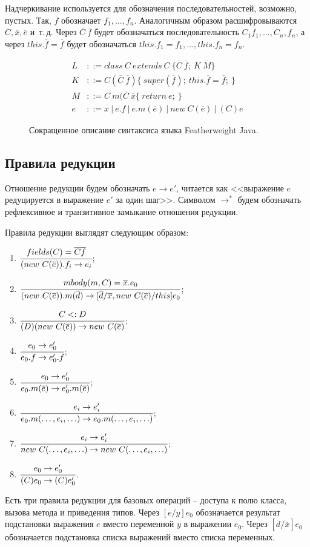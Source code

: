 Надчеркивание используется для обозначения последовательностей, возможно, пустых.
Так, $\overline{f}$ обозначает $f_1, \ldots, f_n$.
Аналогичным образом расшифровываются $\overline{C}, \overline{x}, \overline{e}$ и~т.\,д.
Через $\overline{C}\ \overline{f}$ будет обозначаться последовательность $C_1 f_1, \ldots, C_n, f_n$,
а через $this.\overline{f} = \overline{f}$ будет обозначаться $this.f_1 = f_1, \ldots, this.f_n = f_n$.
\begin{figure}
    \begin{align*}
        L &::= class\ C\ extends\ C\ \{\overline{C}\ \overline{f};\ K\ \overline{M}\}\\
        K &::= C(\overline{C}\ \overline{f})\{\ super(\overline{f});\ this.\overline{f} = \overline{f};\ \}\\
        M &::= C\ m(\overline{C}\ \overline{x}\{\ return\ e;\ \}\\
        e &::= x\ |\ e.f\ |\ e.m(\overline{e})\ |\ new\ C(\overline{e})\ |\ (C)e
    \end{align*}
    \caption{Сокращенное описание синтаксиса языка Featherweight Java.}
    \label{fj-syntax}
\end{figure}
\subsection{Правила редукции}
Отношение редукции будем обозначать $e \rightarrow e'$, читается как <<выражение $e$ редуцируется в выражение $e'$ за один шаг>>.
Символом $\rightarrow^*$ будем обозначать рефлексивное и транзитивное замыкание отношения редукции.

Правила редукции выглядят следующим образом:
\begin{enumerate}
    \item $\cfrac{fields(C) = \overline{C}\overline{f}}{(new\ C(\overline{e})).f_i \rightarrow e_i}$;
    \item $\cfrac{mbody(m, C) = \overline{x}.e_0}{(new\ C(\overline{e})).m(\overline{d}) \rightarrow [\overline{d}/\overline{x}, new\ C(\overline{e})/this]e_0}$;
    \item $\cfrac{C <: D}{(D)(new\ C(\overline{e})) \rightarrow new\ C(\overline{e})}$;
    \item $\cfrac{e_0 \rightarrow e_0'}{e_0.f \rightarrow e_0'.f}$;
    \item $\cfrac{e_0 \rightarrow e_0'}{e_0.m(\overline{e}) \rightarrow e_0'.m(\overline{e})}$;
    \item $\cfrac{e_i \rightarrow e_i'}{e_0.m(\ldots, e_i, \ldots) \rightarrow e_0.m(\ldots, e_i, \ldots)}$;
    \item $\cfrac{e_i \rightarrow e_i'}{new\ C(\ldots, e_i, \ldots) \rightarrow new\ C(\ldots, e_i, \ldots)}$;
    \item $\cfrac{e_0 \rightarrow e_0'}{(C)e_0 \rightarrow (C)e_0'}$.
\end{enumerate}
Есть три правила редукции для базовых операций -- доступа к полю класса, вызова метода и приведения типов.
Через $[e/y]e_0$ обозначается результат подстановки выражения $e$ вместо переменной $y$ в выражении $e_0$.
Через $[\overline{d}/\overline{x}]e_0$ обозначается подстановка списка выражений вместо списка переменных.
